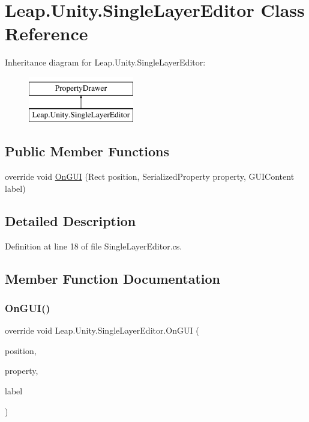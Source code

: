 \hypertarget{class_leap_1_1_unity_1_1_single_layer_editor}{}\section{Leap.\+Unity.\+Single\+Layer\+Editor Class Reference}
\label{class_leap_1_1_unity_1_1_single_layer_editor}
Inheritance diagram for Leap.\+Unity.\+Single\+Layer\+Editor\+:\begin{figure}[H]
\begin{center}
\leavevmode
\includegraphics[height=2.000000cm]{class_leap_1_1_unity_1_1_single_layer_editor}
\end{center}
\end{figure}
\subsection*{Public Member Functions}
\begin{DoxyCompactItemize}
\item 
override void \mbox{\hyperlink{class_leap_1_1_unity_1_1_single_layer_editor_aa2279c0d9f38650e8c14a0873b29d23a}{On\+G\+UI}} (Rect position, Serialized\+Property property, G\+U\+I\+Content label)
\end{DoxyCompactItemize}


\subsection{Detailed Description}


Definition at line 18 of file Single\+Layer\+Editor.\+cs.



\subsection{Member Function Documentation}
\mbox{\label{class_leap_1_1_unity_1_1_single_layer_editor_aa2279c0d9f38650e8c14a0873b29d23a}} 
\subsubsection{\texorpdfstring{OnGUI()}{OnGUI()}}
{\footnotesize\ttfamily override void Leap.\+Unity.\+Single\+Layer\+Editor.\+On\+G\+UI (\begin{DoxyParamCaption}\item[{Rect}]{position,  }\item[{Serialized\+Property}]{property,  }\item[{G\+U\+I\+Content}]{label }\end{DoxyParamCaption})}



